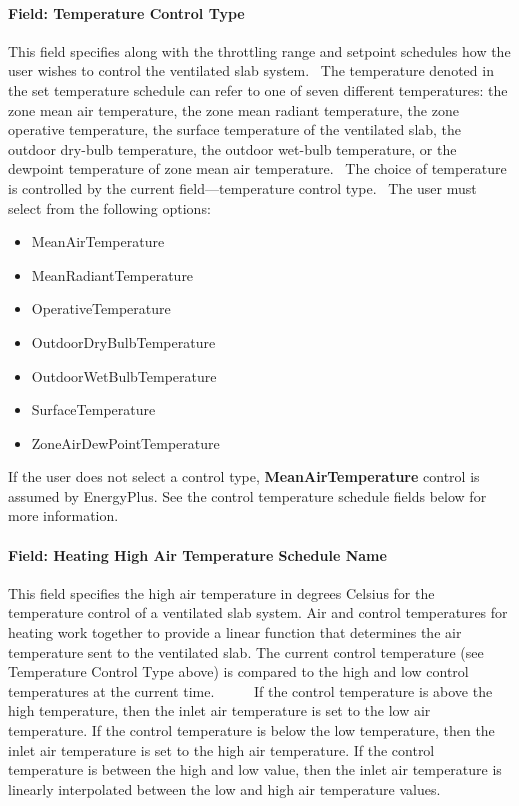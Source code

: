 \paragraph{Field: Temperature Control Type}\label{field-temperature-control-type-4}

This field specifies along with the throttling range and setpoint schedules how the user wishes to control the ventilated slab system.~ The temperature denoted in the set temperature schedule can refer to one of seven different temperatures: the zone mean air temperature, the zone mean radiant temperature, the zone operative temperature, the surface temperature of the ventilated slab, the outdoor dry-bulb temperature, the outdoor wet-bulb temperature, or the dewpoint temperature of zone mean air temperature.~ The choice of temperature is controlled by the current field---temperature control type.~ The user must select from the following options:

\begin{itemize}
\item
  MeanAirTemperature
\item
  MeanRadiantTemperature
\item
  OperativeTemperature
\item
  OutdoorDryBulbTemperature
\item
  OutdoorWetBulbTemperature
\item
  SurfaceTemperature
\item
  ZoneAirDewPointTemperature
\end{itemize}

If the user does not select a control type, \textbf{MeanAirTemperature} control is assumed by EnergyPlus. See the control temperature schedule fields below for more information.

\paragraph{Field: Heating High Air Temperature Schedule Name}\label{field-heating-high-air-temperature-schedule-name}

This field specifies the high air temperature in degrees Celsius for the temperature control of a ventilated slab system. Air and control temperatures for heating work together to provide a linear function that determines the air temperature sent to the ventilated slab. The current control temperature (see Temperature Control Type above) is compared to the high and low control temperatures at the current time.~~~~~ If the control temperature is above the high temperature, then the inlet air temperature is set to the low air temperature. If the control temperature is below the low temperature, then the inlet air temperature is set to the high air temperature. If the control temperature is between the high and low value, then the inlet air temperature is linearly interpolated between the low and high air temperature values.


